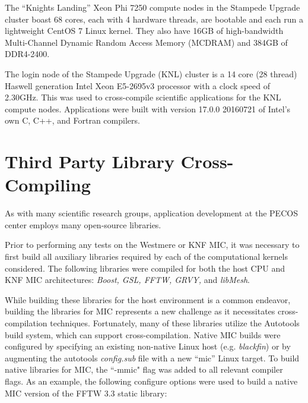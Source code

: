 The ``Knights Landing'' Xeon Phi 7250 compute nodes in the Stampede Upgrade
cluster boast 68 cores, each with 4 hardware threads, are bootable and each run
a lightweight CentOS 7 Linux kernel.  They also have 16GB of high-bandwidth
Multi-Channel Dynamic Random Access Memory (MCDRAM) and 384GB of DDR4-2400.

The login node of the Stampede Upgrade (KNL) cluster is a 14 core (28 thread)
Haswell generation Intel Xeon E5-2695v3 processor with a clock speed of
2.30GHz.  This was used to cross-compile scientific applications for the KNL
compute nodes.  Applications were built with version 17.0.0 20160721 of Intel's
own C, C++, and Fortran compilers.

\section{Third Party Library Cross-Compiling}
\label{sec:cross_compile}

As with many scientific research groups, application development at
the PECOS center employs many open-source libraries.

Prior to
performing any tests on the Westmere or KNF MIC, it was necessary to
first build all auxiliary libraries required by each of the
computational kernels considered.
The following libraries were
compiled for both the host CPU and KNF MIC architectures: {\em Boost,
GSL, FFTW\cite{FFTW05}, GRVY,} and
{\em libMesh}.

While building these libraries for the host environment is
a common endeavor, building the libraries for MIC
represents a new challenge as it necessitates cross-compilation
techniques.
Fortunately, many of these libraries utilize the
Autotools build system, which can support cross-compilation.
Native MIC builds were configured by
specifying an existing non-native Linux host
(e.g. {\em blackfin}) or by augmenting the autotools {\em config.sub}
file with a new ``mic'' Linux target.
To build native libraries for MIC, the ``-mmic"
flag was added to all relevant compiler flags.
As an example, the following configure options were used to build a
native MIC version of the FFTW 3.3 static library:

